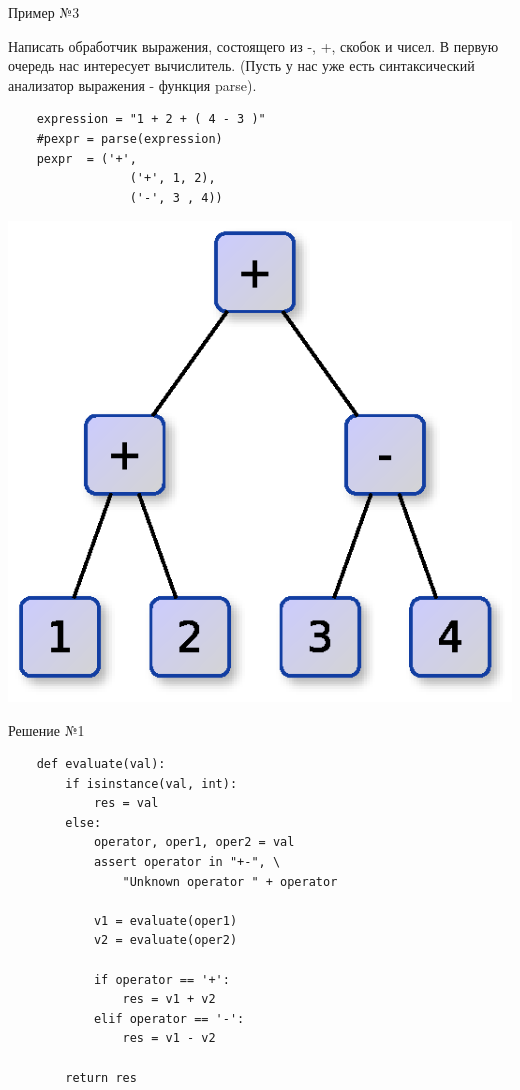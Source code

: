 \documentclass{article}
\begin{document}
\begin{center} Пример №3 \end{center}
    Написать обработчик выражения, состоящего из -, +, скобок и чисел.
    В первую очередь нас интересует вычислитель.
    (Пусть у нас уже есть синтаксический анализатор выражения - функция parse).
\begin{lstlisting}
    expression = "1 + 2 + ( 4 - 3 )"
    #pexpr = parse(expression)
    pexpr  = ('+', 
                 ('+', 1, 2), 
                 ('-', 3 , 4))
\end{lstlisting}
    \begin{center} \includegraphics{images/parse_tree.eps} \end{center}     
\newpage

\begin{center} Решение №1 \end{center}
\begin{lstlisting}
    def evaluate(val):
        if isinstance(val, int):
            res = val
        else:
            operator, oper1, oper2 = val
            assert operator in "+-", \
                "Unknown operator " + operator

            v1 = evaluate(oper1)
            v2 = evaluate(oper2)

            if operator == '+':
                res = v1 + v2
            elif operator == '-':
                res = v1 - v2

        return res
\end{lstlisting}
\newpage
\end{document}
